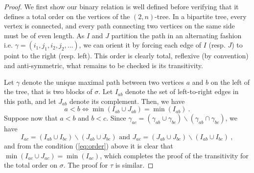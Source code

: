 \documentclass{amsart}
\theoremstyle{definition}
\newcommand{\ssm}{\smallsetminus} %
\begin{document}
\begin{proof}
We first show our binary relation is well defined before verifying that it defines a total order on the vertices of the $(2,n)$-tree.
In a bipartite tree, every vertex is connected, and every path connecting two vertices on the same side must be of even length. 
As $I$ and $J$ partition the path in an alternating fashion i.e. $\gamma=(i_1,j_1,i_2,j_2,\dots)$, we can orient it by forcing each edge of $I$ (resp. $J$) to point to the right (resp. left). 
This order is clearly total, reflexive (by convention) and anti-symmetric, what remains to be checked is its transitivity. 

Let $\gamma$ denote the unique maximal path between two vertices $a$ and $b$ on the left of the tree, that is two blocks of $\sigma$. 
Let $I_{ab}$ denote the set of left-to-right edges in this path, and let $J_{ab}$ denote its complement. 
Then, we have 
\begin{equation}
    \label{eq:order}
    a < b \iff \min(I_{ab}\cup J_{ab})=\min(I_{ab}) \ . 
\end{equation}
Suppose now that $a < b$ and $b < c$.
Since $\gamma_{ac}= (\gamma_{ab} \cup \gamma_{bc}) \ssm (\gamma_{ab} \cap \gamma_{bc})$, we have $$ I_{ac}=(I_{ab}\cup I_{bc}) \ssm (J_{ab} \cup J_{bc}) \text{ and } J_{ac}=(J_{ab}\cup J_{bc}) \ssm (I_{ab} \cup I_{bc}) \ , $$ and from the condition (\ref{eq:order}) above it is clear that $\min(I_{ac}\cup J_{ac})=\min(I_{ac})$, which completes the proof of the transitivity for the total order on $\sigma$. 
The proof for $\tau$ is similar. 
\end{proof}
\end{document}

